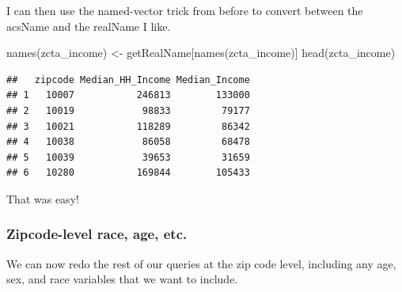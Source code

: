 \documentclass[
  openany]{book}
\newenvironment{Shaded}{\begin{snugshade}}{\end{snugshade}}
\newcommand{\FunctionTok}[1]{\textcolor[rgb]{0.00,0.00,0.00}{#1}}
\newcommand{\NormalTok}[1]{#1}
\newcommand{\OtherTok}[1]{\textcolor[rgb]{0.56,0.35,0.01}{#1}}
\newcommand{\SpecialCharTok}[1]{\textcolor[rgb]{0.00,0.00,0.00}{#1}}
\begin{document}
I can then use the named-vector trick from before to convert between the acsName and the realName I like.

\begin{Shaded}
\end{Shaded}

\begin{Shaded}
\begin{Highlighting}[]
\FunctionTok{names}\NormalTok{(zcta\_income) }\OtherTok{\textless{}{-}}\NormalTok{ getRealName[}\FunctionTok{names}\NormalTok{(zcta\_income)]}
\FunctionTok{head}\NormalTok{(zcta\_income)}
\end{Highlighting}
\end{Shaded}

\begin{verbatim}
##   zipcode Median_HH_Income Median_Income
## 1   10007           246813        133000
## 2   10019            98833         79177
## 3   10021           118289         86342
## 4   10038            86058         68478
## 5   10039            39653         31659
## 6   10280           169844        105433
\end{verbatim}

That was easy!

\hypertarget{zipcode-level-race-age-etc.}{%
\subsubsection*{Zipcode-level race, age, etc.}\label{zipcode-level-race-age-etc.}}

We can now redo the rest of our queries at the zip code level, including any age, sex, and race variables that we want to include.
\end{document}
